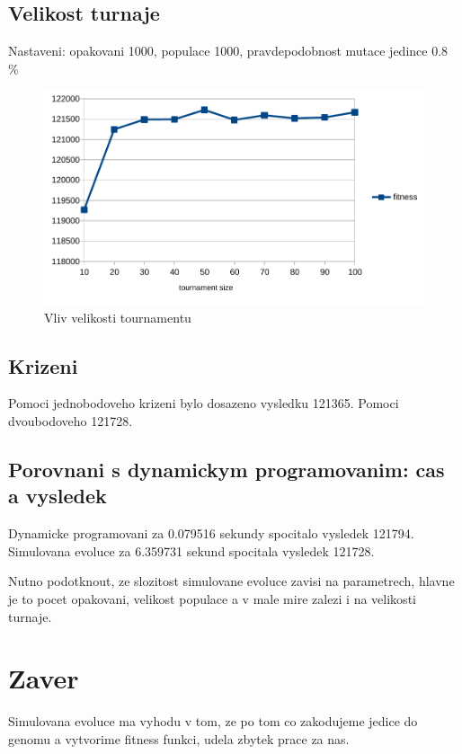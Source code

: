 \documentclass[12pt,a4paper]{article}
\begin{document}
\subsection{Velikost turnaje}
Nastaveni: opakovani 1000, populace 1000, pravdepodobnost mutace jedince 0.8 \%
\begin{figure}[H]
	\caption{Vliv velikosti tournamentu}
 	\centerline{\includegraphics{tournament.pdf}}
\end{figure}

\subsection{Krizeni}

Pomoci jednobodoveho krizeni bylo dosazeno vysledku 121365. Pomoci dvoubodoveho 121728.

\subsection{Porovnani s dynamickym programovanim: cas a vysledek}
Dynamicke programovani za 0.079516 sekundy spocitalo vysledek 121794.
Simulovana evoluce za 6.359731 sekund spocitala vysledek 121728.

Nutno podotknout, ze slozitost simulovane evoluce zavisi na parametrech, hlavne je to pocet opakovani, velikost populace a v male mire zalezi i na velikosti turnaje.

\section{Zaver}

Simulovana evoluce ma vyhodu v tom, ze po tom co zakodujeme jedice do genomu a vytvorime fitness funkci, udela zbytek prace za nas.

\end{document}
